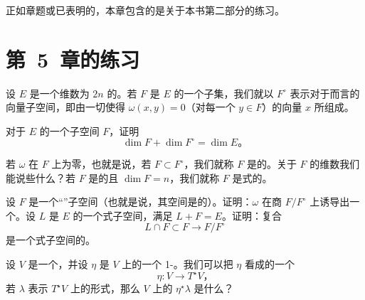 
正如章题或已表明的，本章包含的是关于本书第二部分的练习。

\section{第~5~章的练习}
\label{sec:ch14-exercises-ch5}

\begin{exercise}\label{ex:ch14-001-symplectic-orthogonal}
设 $E$ 是一个维数为 $2n$ 的\trSymplectic\trVectorSpace。若 $F$ 是 $E$ 的一个子集，我们就以 $F^\circ$ 表示对于\trSymplecticForm{}而言\trOrthogonal{}的向量子空间，即由一切使得 $\omega(x,y)=0$（对每一个 $y\in F$）的向量 $x$ 所组成。

对于 $E$ 的一个子空间 $F$，证明
\[
\dim F+\dim F^\circ=\dim E\text{。}
\]

若\trForm{} $\omega$ 在 $F$ 上为零，也就是说，若 $F\subset F^\circ$，我们就称 $F$ 是\trIsotropic{}的。关于 $F$ 的维数我们能说些什么？若 $F$ 是\trIsotropic{}的且 $\dim F=n$，我们就称 $F$ 是\trLagrange{}式的。

设 $F$ 是一个“\trCoisotropic”子空间（也就是说，其\trOrthogonal{}空间是\trIsotropic{}的）。证明：$\omega$ 在商\trVectorSpace{} $F/F^\circ$ 上诱导出一个\trSymplecticForm。设 $L$ 是 $E$ 的一个\trLagrange{}式子空间，满足 $L+F=E$。证明：复合
\[
L\cap F\subset F\longrightarrow F/F^\circ
\]
是一个\trLagrange{}式子空间的\trInjective。
\end{exercise}

\begin{exercise}\label{ex:ch14-002-liouville-pullback}
设 $V$ 是一个\trManifold，并设 $\eta$ 是 $V$ 上的一个 1-\trForm。我们可以把 $\eta$ 看成\trCotangent{}\trVectorBundle{}的一个\trSection
\[
\eta\colon V\longrightarrow T^\star V\text{，}
\]
若 $\lambda$ 表示 $T^\star V$ 上的\trLiouville{}形式，那么 $V$ 上的\trForm{} $\eta^\star\lambda$ 是什么？
\end{exercise}


